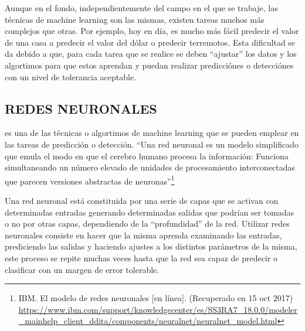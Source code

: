     Aunque en el fondo, independientemente del campo en el que se trabaje, las técnicas de machine learning son las mismas, existen tareas muchos más complejos que otras. Por ejemplo, hoy en día, es mucho más fácil predecir el valor de una casa a predecir el valor del dólar o predecir terremotos. Esta dificultad se da debido a que, para cada tarea que se realice se deben “ajustar” los datos y los algortimos para que estos aprendan y puedan realizar predicciónes o detecciónes con un nivel de tolerancia aceptable.
    
    \subsection{REDES NEURONALES} es una de las técnicas o algortimos de machine learning que se pueden emplear en las tareas de predicción o detección. “Una red neuronal es un modelo simplificado que emula el modo en que el cerebro humano procesa la información: Funciona simultaneando un número elevado de unidades de procesamiento interconectadas que parecen versiones abstractas de neuronas”\footnote[11]{IBM. El modelo de redes neuronales [en línea]. (Recuperado en 15 oct 2017) \url{https://www.ibm.com/support/knowledgecenter/es/SS3RA7_18.0.0/modeler_mainhelp_client_ddita/components/neuralnet/neuralnet_model.html} }
    
  

  Una red neuronal está constituida por una serie de capas que se activan con determinadas entradas generando determinadas salidas que podrían ser tomadas o no por otras capas, dependiendo de la “profundidad” de la red. Utilizar redes neuronales consiste en hacer que la misma aprenda examinando las entradas, prediciendo las salidas y haciendo ajustes a los distintos parámetros de la misma, este proceso se repite muchas veces hasta que la red sea capaz de predecir o clasificar con un margen de error tolerable.
  
